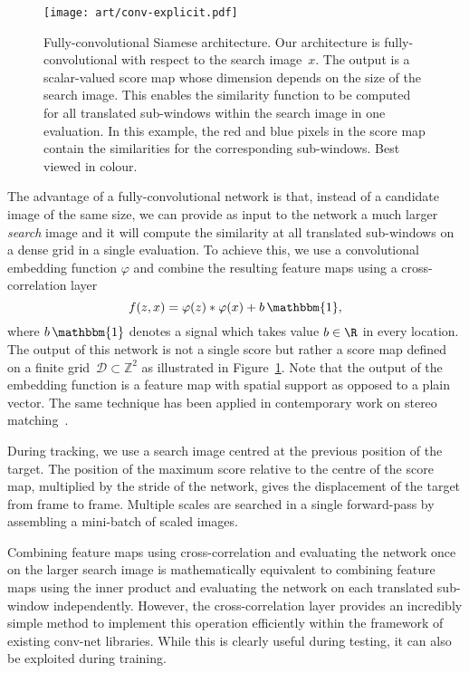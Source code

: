 \begin{figure}[t]
\centering
\texttt{[image: art/conv-explicit.pdf]}
\caption{Fully-convolutional Siamese architecture.
Our architecture is fully-convolutional with respect to the search image~$x$.
The output is a scalar-valued score map whose dimension depends on the size of the search image.
This enables the similarity function to be computed for all translated sub-windows within the search image in one evaluation.
In this example, the red and blue pixels in the score map contain the similarities for the corresponding sub-windows.
Best viewed in colour.
}
\label{fig:fully-conv-siamese}
\end{figure}

The advantage of a fully-convolutional network is that, instead of a candidate image of the same size, we can provide as input to the network a much larger \emph{search} image and it will compute the similarity at all translated sub-windows on a dense grid in a single evaluation.
To achieve this, we use a convolutional embedding function $\varphi$ and combine the resulting feature maps using a cross-correlation layer
\begin{equation}\label{eq:cross-correlation}
f(z, x) = \varphi(z) * \varphi(x) + b \, \mathbbm{1},
\end{equation}
where $b \, \mathbbm{1}$ denotes a signal which takes value $b \in \R$ in every location.
The output of this network is not a single score but rather a score map defined on a finite grid~$\mathcal{D} \subset \mathbb{Z}^{2}$ as illustrated in Figure~\ref{fig:fully-conv-siamese}.
Note that the output of the embedding function is a feature map with spatial support as opposed to a plain vector.
The same technique has been applied in contemporary work on stereo matching~\cite{luo2016efficient}.

During tracking, we use a search image centred at the previous position of the target.
The position of the maximum score relative to the centre of the score map, multiplied by the stride of the network, gives the displacement of the target from frame to frame.
Multiple scales are searched in a single forward-pass by assembling a mini-batch of scaled images.

Combining feature maps using cross-correlation and evaluating the network once on the larger search image is mathematically equivalent to combining feature maps using the inner product and evaluating the network on each translated sub-window independently.
However, the cross-correlation layer provides an incredibly simple method to implement this operation efficiently within the framework of existing conv-net libraries.
While this is clearly useful during testing, it can also be exploited during training.


